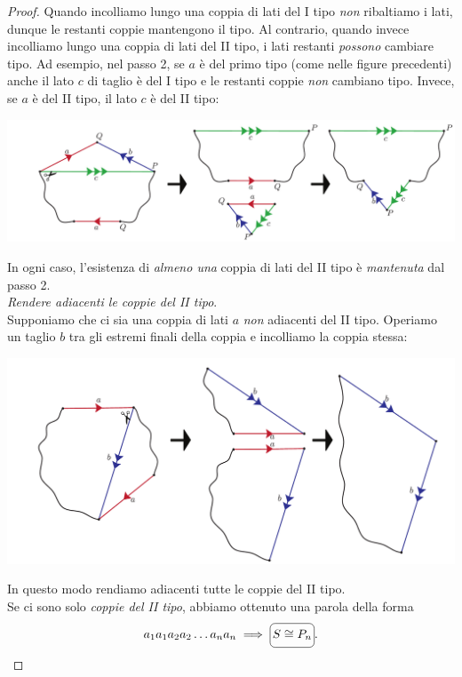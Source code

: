 \begin{proof}{}
 Quando incolliamo lungo una coppia di lati del I tipo \textit{non} ribaltiamo i lati, dunque le restanti coppie mantengono il tipo. Al contrario, quando invece incolliamo lungo una coppia di lati del II tipo, i lati restanti \textit{possono} cambiare tipo. Ad esempio, nel passo 2, se $a$ è del primo tipo (come nelle figure precedenti) anche il lato $c$ di taglio è del I tipo e le restanti coppie \textit{non} cambiano tipo. Invece, se $a$ è del II tipo, il lato $c$ è del II tipo:
	\begin{center}
		\includegraphics[trim=0cm 0cm 0cm 0cm, clip, scale=0.35]{images/cutandpastealgorithmstep2-3.pdf}
	\end{center}
In ogni caso, l'esistenza di \textit{almeno una} coppia di lati del II tipo è \textit{mantenuta} dal passo 2.\\
 \textit{Rendere adiacenti le coppie del II tipo}.\\
Supponiamo che ci sia una coppia di lati $a$ \textit{non} adiacenti del II tipo. Operiamo un taglio $b$ tra gli estremi finali della coppia e incolliamo la coppia stessa:
	\begin{center}
	\includegraphics[trim=0cm 0cm 0cm 0cm, clip, scale=0.35]{images/cutandpastealgorithmstep3.pdf}
\end{center}
In questo modo rendiamo adiacenti tutte le coppie del II tipo.\\
Se ci sono solo \textit{coppie del II tipo}, abbiamo ottenuto una parola della forma
\begin{equation*}
	a_1a_1a_2a_2\ldots a_na_n \implies \ovaled{S\cong P_n}.

\end{equation*}
\end{proof}
